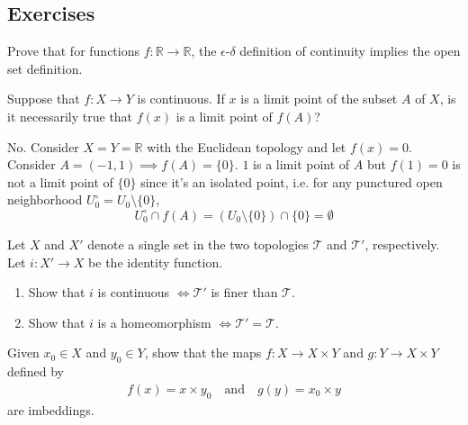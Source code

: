 \subsection{Exercises}

  \begin{exercise}[Munkres 18.1]
    Prove that for functions $f : \mathbb{R} \to \mathbb{R}$, the $\epsilon$-$\delta$ definition of continuity implies the open set definition.
  \end{exercise}

  \begin{exercise}[Munkres 18.2]
    Suppose that $f : X \to Y$ is continuous. If $x$ is a limit point of the subset $A$ of $X$, is it necessarily true that $f(x)$ is a limit point of $f(A)$?
  \end{exercise}
  \begin{solution}
    No. Consider $X = Y = \mathbb{R}$ with the Euclidean topology and let $f(x) = 0$. Consider $A = (-1, 1) \implies f(A) = \{0\}$. $1$ is a limit point of $A$ but $f(1) = 0$ is not a limit point of $\{0\}$ since it's an isolated point, i.e. for any punctured open neighborhood $U_0^\circ = U_0 \setminus \{0\}$, 
    \begin{equation}
      U_0^\circ \cap f(A) = (U_0 \setminus \{0\}) \cap \{0\} = \emptyset
    \end{equation}
  \end{solution}

  \begin{exercise}[Munkres 18.3]
    Let $X$ and $X'$ denote a single set in the two topologies $\mathcal{T}$ and $\mathcal{T}'$, respectively. Let $i : X' \to X$ be the identity function.
    \begin{enumerate}
      \item Show that $i$ is continuous $\Leftrightarrow \mathcal{T}'$ is finer than $\mathcal{T}$.
      \item Show that $i$ is a homeomorphism $\Leftrightarrow \mathcal{T}' = \mathcal{T}$.
    \end{enumerate}
  \end{exercise}

  \begin{exercise}[Munkres 18.4]
    Given $x_0 \in X$ and $y_0 \in Y$, show that the maps $f : X \to X \times Y$ and $g : Y \to X \times Y$ defined by
    \begin{align*}
      f(x) = x \times y_0 \quad \text{and} \quad g(y) = x_0 \times y
    \end{align*}
    are imbeddings.
  \end{exercise}

